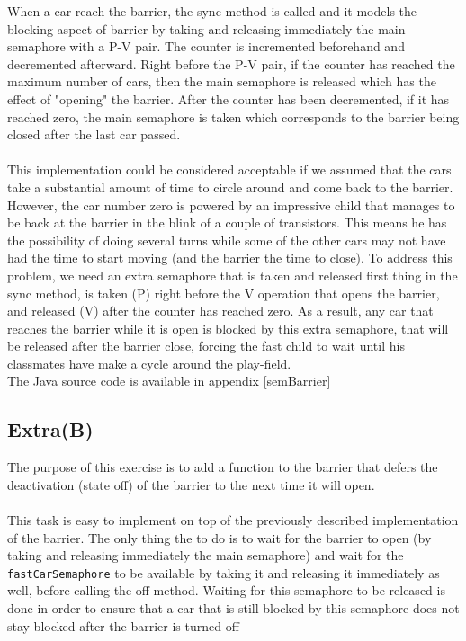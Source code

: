 When a car reach the barrier, the sync method is called and it models the
blocking aspect of barrier by taking and releasing immediately the main
semaphore with a P-V pair. The counter is incremented beforehand and decremented
afterward. Right before the P-V pair, if the counter has reached the
maximum number of cars, then the main semaphore is released which has the effect
of "opening" the barrier. After the counter has been decremented, if it has
reached zero, the main semaphore is taken which corresponds to the barrier being
closed after the last car passed.\\
~\\
This implementation could be considered acceptable if we assumed that the cars 
take a substantial amount of time to circle around and come back to the barrier.
However, the car number zero is powered by an impressive child that manages to
be back at the barrier in the blink of a couple of transistors. This means he
has the possibility of doing several turns while some of the other cars may not
have had the time to start moving (and the barrier the time to close). To
address this problem, we need an extra semaphore that is taken and released
first thing in the sync method, is taken (P) right before the V operation that
opens the barrier, and released (V) after the counter has reached zero. As a
result, any car that reaches the barrier while it is open is blocked by this
extra semaphore, that will be released after the barrier close, forcing the fast
child to wait until his classmates have make a cycle around the play-field.
~\\
The Java source code is available in appendix \ref{semBarrier}

\subsection{Extra(B)}

The purpose of this exercise is to add a function to the barrier that defers the
deactivation (state off) of the barrier to the next time it will open.\\
~\\
This task is easy to implement on top of the previously described implementation of the barrier. The only thing the to do is to wait for the barrier to open (by
taking and releasing immediately the main semaphore) and wait for the
\texttt{fastCarSemaphore} to be available by taking it and releasing it
immediately as well, before calling the off method. Waiting for this semaphore
to be released is done in order to ensure that a car that is still blocked 
by this semaphore does not stay blocked after the barrier is turned off
